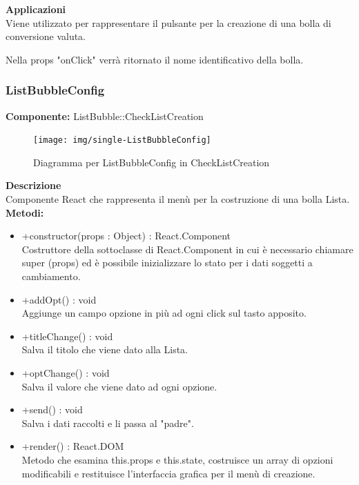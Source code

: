 \textbf{Applicazioni}\\
Viene utilizzato per rappresentare il pulsante per la creazione di una bolla di conversione valuta.

Nella props "onClick" verrà ritornato il nome identificativo della bolla. 


\clearpage

\subsubsection{ListBubbleConfig}
\textbf{Componente:}  ListBubble::CheckListCreation\\
   \FloatBarrier
   \begin{figure}[ht]
   \centering
   \texttt{[image: img/single-ListBubbleConfig]}
   \caption{{Diagramma per ListBubbleConfig in CheckListCreation}}
\end{figure}
\FloatBarrier
\textbf{Descrizione}\\
Componente React che rappresenta il menù per la costruzione di una bolla Lista.
\\
\textbf{Metodi:} 
\begin{itemize}
\item +constructor(props : Object) : React.Component 
\\
Costruttore della sottoclasse di React.Component in cui è necessario chiamare super (props) ed è possibile inizializzare lo stato per i dati soggetti a cambiamento.

\item +addOpt() : void 
\\
Aggiunge un campo opzione in più ad ogni click sul tasto apposito.

\item +titleChange() : void 
\\
Salva il titolo che viene dato alla Lista.

\item +optChange() : void 
\\
Salva il valore che viene dato ad ogni opzione.

\item +send() : void 
\\
Salva i dati raccolti e li passa al "padre".

\item +render() : React.DOM
\\
Metodo che esamina this.props e this.state, costruisce un array di opzioni modificabili e restituisce l'interfaccia grafica per il menù di creazione.
\end{itemize} 



